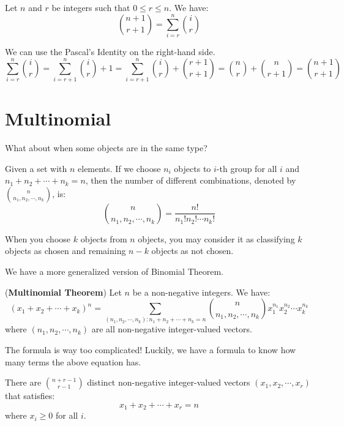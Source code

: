\documentclass{huhtakm-template-book}
\begin{document}
\begin{thm}
	Let $n$ and $r$ be integers such that $0\leq r\leq n$. We have:
	\begin{equation*}
		\binom{n+1}{r+1}=\sum_{i=r}^{n}\binom{i}{r}
	\end{equation*}
\end{thm}
\begin{proofing}
	We can use the Pascal's Identity on the right-hand side.
	\begin{equation*}
		\sum_{i=r}^{n}\binom{i}{r}=\sum_{i=r+1}^{n}\binom{i}{r}+1=\sum_{i=r+1}^{n}\binom{i}{r}+\binom{r+1}{r+1}=\binom{n}{r}+\binom{n}{r+1}=\binom{n+1}{r+1}
	\end{equation*}
\end{proofing}

\newpage
\section{Multinomial}
What about when some objects are in the same type?
\begin{thm}
	Given a set with $n$ elements. If we choose $n_{i}$ objects to $i$-th group for all $i$ and $n_{1}+n_{2}+\cdots+n_{k}=n$, then the number of different combinations, denoted by $\binom{n}{n_{1},n_{2},\cdots,n_{k}}$, is:
	\begin{equation*}
		\binom{n}{n_{1},n_{2},\cdots,n_{k}}=\frac{n!}{n_{1}!n_{2}!\cdots n_{k}!}
	\end{equation*}
\end{thm}
\begin{rem}
	When you choose $k$ objects from $n$ objects, you may consider it as classifying $k$ objects as chosen and remaining $n-k$ objects as not chosen. 
\end{rem}
We have a more generalized version of Binomial Theorem.
\begin{thm}(\textbf{Multinomial Theorem})
	Let $n$ be a non-negative integers. We have:
	\begin{equation*}
		(x_{1}+x_{2}+\cdots+x_{k})^{n}=\sum_{(n_{1},n_{2},\cdots,n_{k}):n_{1}+n_{2}+\cdots+n_{k}=n}\binom{n}{n_{1},n_{2},\cdots,n_{k}}x_{1}^{n_{1}}x_{2}^{n_{2}}\cdots x_{k}^{n_{k}}
	\end{equation*}
	where $(n_{1},n_{2},\cdots,n_{k})$ are all non-negative integer-valued vectors.
\end{thm}
The formula is way too complicated! Luckily, we have a formula to know how many terms the above equation has.
\begin{thm}
	There are $\binom{n+r-1}{r-1}$ distinct non-negative integer-valued vectors $(x_{1},x_{2},\cdots,x_{r})$ that satisfies:
	\begin{equation*}
		x_{1}+x_{2}+\cdots+x_{r}=n
	\end{equation*}
	where $x_{i}\geq 0$ for all $i$.
\end{thm}
\end{document}
